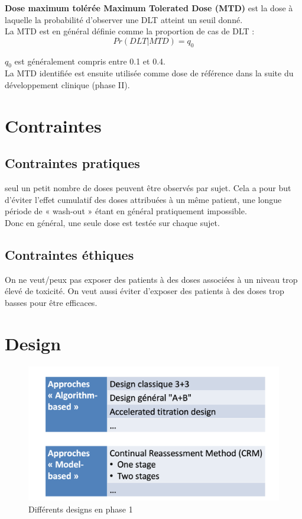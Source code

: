 \textbf{Dose maximum tolérée Maximum Tolerated Dose (MTD)} est la dose à laquelle la probabilité d’observer une DLT atteint un seuil donné.\\

La MTD est en général définie comme la proportion de cas de DLT :
$$Pr(DLT|MTD)=q_{0}$$

$q_{0}$ est généralement compris entre 0.1 et 0.4.\\

La MTD identifiée est ensuite utilisée comme dose de référence dans la suite du développement clinique (phase II).\\


\section{Contraintes}

\subsection{Contraintes pratiques}
seul un petit nombre de doses peuvent être observés par sujet. Cela a pour but d'éviter l'effet cumulatif des doses attribuées à un même patient, une longue période de « wash-out » étant en général pratiquement impossible.\\
Donc en général, une seule dose est testée sur chaque sujet.

\subsection{Contraintes éthiques}

On ne veut/peux pas exposer des patients à des doses associées à un niveau trop élevé de toxicité. On veut aussi éviter d'exposer des patients à des doses trop basses pour être efficaces. 

\section{Design}

\begin{figure}[H]
    \centering
    \includegraphics[scale=0.3]{images/designphase1.png}
    \caption{Différents designs en phase 1}
    \label{fig:designphase1}
\end{figure}

